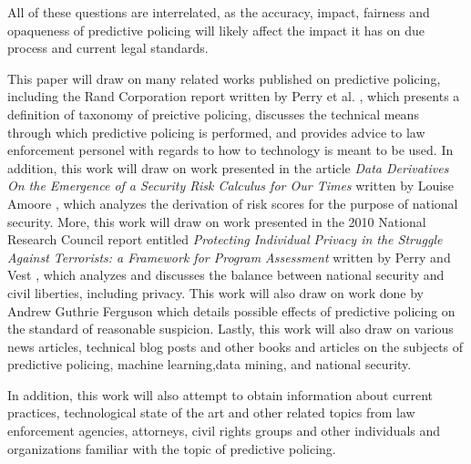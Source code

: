 \documentclass[12pt]{article} %
\begin{document}
All of these questions are interrelated, as the accuracy, impact, fairness and opaqueness of predictive policing will likely affect the impact it has on due process and current legal standards. 

This paper will draw on many related works published on predictive policing, including the Rand Corporation report written by Perry et al. \cite{perryetal}, which presents a definition of taxonomy of preictive policing, discusses the technical means through which predictive policing is performed, and provides advice to law enforcement personel with regards to how to technology is meant to be used. In addition, this work will draw on work presented in the article \emph{Data Derivatives On the Emergence of a Security Risk Calculus for Our Times} written by Louise Amoore \cite{amoore2011data}, which analyzes the derivation of risk scores for the purpose of national security. More, this work will draw on work presented in the 2010 National Research Council report entitled \emph{Protecting Individual Privacy in the Struggle Against Terrorists: a Framework for Program Assessment} written by Perry and Vest \cite{perryprotecting}, which analyzes and discusses the balance between national security and civil liberties, including privacy. This work will also draw on work done by Andrew Guthrie Ferguson which details possible effects of predictive policing on the standard of reasonable suspicion. \cite{ferguson2012predictive} Lastly, this work will also draw on various news articles, technical blog posts and other books and articles on the subjects of predictive policing, machine learning,data mining, and national security. \cite{hildebrandt2013privacy} \cite{hardt} \cite{robinson2014civil}
\cite{intercept}

In addition, this work will also attempt to obtain information about current practices, technological state of the art and other related topics from law enforcement agencies, attorneys, civil rights groups and other individuals and organizations familiar with the topic of predictive policing.\cite{dekota}


\end{document}
